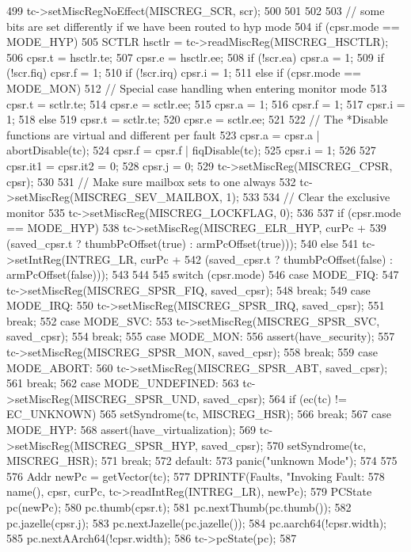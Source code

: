 \begin{DoxyCode}
{{{499             tc->setMiscRegNoEffect(MISCREG_SCR, scr);
500         }
501     }
502 
503     // some bits are set differently if we have been routed to hyp mode
504     if (cpsr.mode == MODE_HYP) {
505         SCTLR hsctlr = tc->readMiscReg(MISCREG_HSCTLR);
506         cpsr.t = hsctlr.te;
507         cpsr.e = hsctlr.ee;
508         if (!scr.ea)  {cpsr.a = 1;}
509         if (!scr.fiq) {cpsr.f = 1;}
510         if (!scr.irq) {cpsr.i = 1;}
511     } else if (cpsr.mode == MODE_MON) {
512         // Special case handling when entering monitor mode
513         cpsr.t = sctlr.te;
514         cpsr.e = sctlr.ee;
515         cpsr.a = 1;
516         cpsr.f = 1;
517         cpsr.i = 1;
518     } else {
519         cpsr.t = sctlr.te;
520         cpsr.e = sctlr.ee;
521 
522         // The *Disable functions are virtual and different per fault
523         cpsr.a = cpsr.a | abortDisable(tc);
524         cpsr.f = cpsr.f | fiqDisable(tc);
525         cpsr.i = 1;
526     }
527     cpsr.it1 = cpsr.it2 = 0;
528     cpsr.j = 0;
529     tc->setMiscReg(MISCREG_CPSR, cpsr);
530 
531     // Make sure mailbox sets to one always
532     tc->setMiscReg(MISCREG_SEV_MAILBOX, 1);
533 
534     // Clear the exclusive monitor
535     tc->setMiscReg(MISCREG_LOCKFLAG, 0);
536 
537     if (cpsr.mode == MODE_HYP) {
538         tc->setMiscReg(MISCREG_ELR_HYP, curPc +
539                 (saved_cpsr.t ? thumbPcOffset(true)  : armPcOffset(true)));
540     } else {
541         tc->setIntReg(INTREG_LR, curPc +
542                 (saved_cpsr.t ? thumbPcOffset(false) : armPcOffset(false)));
543     }
544 
545     switch (cpsr.mode) {
546       case MODE_FIQ:
547         tc->setMiscReg(MISCREG_SPSR_FIQ, saved_cpsr);
548         break;
549       case MODE_IRQ:
550         tc->setMiscReg(MISCREG_SPSR_IRQ, saved_cpsr);
551         break;
552       case MODE_SVC:
553         tc->setMiscReg(MISCREG_SPSR_SVC, saved_cpsr);
554         break;
555       case MODE_MON:
556         assert(have_security);
557         tc->setMiscReg(MISCREG_SPSR_MON, saved_cpsr);
558         break;
559       case MODE_ABORT:
560         tc->setMiscReg(MISCREG_SPSR_ABT, saved_cpsr);
561         break;
562       case MODE_UNDEFINED:
563         tc->setMiscReg(MISCREG_SPSR_UND, saved_cpsr);
564         if (ec(tc) != EC_UNKNOWN)
565             setSyndrome(tc, MISCREG_HSR);
566         break;
567       case MODE_HYP:
568         assert(have_virtualization);
569         tc->setMiscReg(MISCREG_SPSR_HYP, saved_cpsr);
570         setSyndrome(tc, MISCREG_HSR);
571         break;
572       default:
573         panic("unknown Mode\n");
574     }
575 
576     Addr newPc = getVector(tc);
577     DPRINTF(Faults, "Invoking Fault:%
578             name(), cpsr, curPc, tc->readIntReg(INTREG_LR), newPc);
579     PCState pc(newPc);
580     pc.thumb(cpsr.t);
581     pc.nextThumb(pc.thumb());
582     pc.jazelle(cpsr.j);
583     pc.nextJazelle(pc.jazelle());
584     pc.aarch64(!cpsr.width);
585     pc.nextAArch64(!cpsr.width);
586     tc->pcState(pc);
587 }
\end{DoxyCode}
